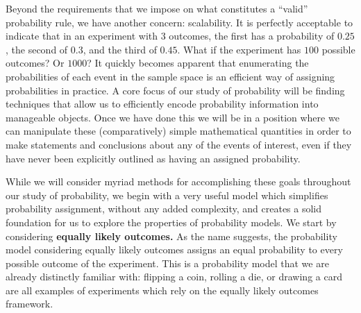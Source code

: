\documentclass[
  letterpaper,
  DIV=11,
  numbers=noendperiod]{scrreprt}
\theoremstyle{definition}
\theoremstyle{definition}
\theoremstyle{definition}
\theoremstyle{remark}
\begin{document}
Beyond the requirements that we impose on what constitutes a ``valid''
probability rule, we have another concern: scalability. It is perfectly
acceptable to indicate that in an experiment with \(3\) outcomes, the
first has a probability of \(0.25\), the second of \(0.3\), and the
third of \(0.45\). What if the experiment has \(100\) possible outcomes?
Or \(1000\)? It quickly becomes apparent that enumerating the
probabilities of each event in the sample space is an efficient way of
assigning probabilities in practice. A core focus of our study of
probability will be finding techniques that allow us to efficiently
encode probability information into manageable objects. Once we have
done this we will be in a position where we can manipulate these
(comparatively) simple mathematical quantities in order to make
statements and conclusions about any of the events of interest, even if
they have never been explicitly outlined as having an assigned
probability.

While we will consider myriad methods for accomplishing these goals
throughout our study of probability, we begin with a very useful model
which simplifies probability assignment, without any added complexity,
and creates a solid foundation for us to explore the properties of
probability models. We start by considering \textbf{equally likely
outcomes.} As the name suggests, the probability model considering
equally likely outcomes assigns an equal probability to every possible
outcome of the experiment. This is a probability model that we are
already distinctly familiar with: flipping a coin, rolling a die, or
drawing a card are all examples of experiments which rely on the equally
likely outcomes framework.
\end{document}
